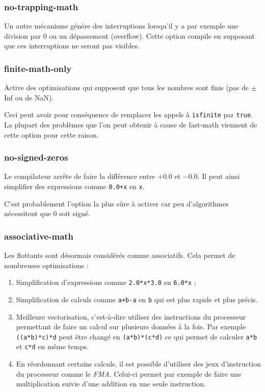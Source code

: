 \documentclass[a4paper,11pt]{report}
\begin{document}
\subsubsection{no-trapping-math}
Un autre mécanisme génère des interruptions lorsqu'il y a par exemple une division par 0 ou un dépassement (overflow).
Cette option compile en supposant que ces interruptions ne seront pas visibles.

\subsubsection{finite-math-only}
Active des optimisations qui supposent que tous les nombres sont finis (pas de $\pm$Inf ou de NaN).

Ceci peut avoir pour conséquence de remplacer les appels à \verb'isfinite' par \verb'true'.
La plupart des problèmes que l'on peut obtenir à cause de fast-math viennent de cette option pour cette raison.

\subsubsection{no-signed-zeros}
Le compilateur arrête de faire la différence entre $+0.0$ et $-0.0$.
Il peut ainsi simplifier des expressions comme \verb'0.0+x' en \verb'x'.

C'est probablement l'option la plus sûre à activer car peu d'algorithmes nécessitent que $0$ soit signé.

\subsubsection{associative-math}
Les flottants sont désormais considérés comme associatifs.
Cela permet de nombreuses optimisations :
\begin{enumerate}
    \item Simplification d'expressions comme \verb'2.0*x*3.0' en \verb'6.0*x' ;
    \item Simplification de calculs comme \verb'a+b-a' en \verb'b' qui est plus rapide et plus précis.
    \item Meilleure vectorisation, c'est-à-dire utiliser des instructions du processeur permettant de faire un calcul sur plusieurs données à la fois.
          Par exemple \verb'((a*b)*c)*d' peut être changé en \verb'(a*b)*(c*d)' ce qui permet de calculer \verb'a*b' et \verb'c*d' en même temps.
    \item En réordonnant certains calculs, il est possible d'utiliser des jeux d'instruction du processeur comme le \emph{FMA}.
          Celui-ci permet par exemple de faire une multiplication suivie d'une addition en une seule instruction.
\end{enumerate}
\end{document}
